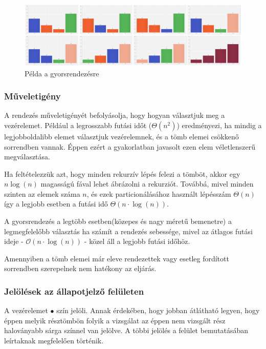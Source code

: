 \documentclass{elteikthesis}
\newcommand{\hiddensubsubsection}[1]{
	\stepcounter{subsubsection}
	\subsubsection*{{#1}}	
}
\begin{document}
 \begin{figure}[H]
 	\centering
 	\includegraphics[width=1\textwidth]{pics/quick.jpg}
 	\caption{Példa a gyorsrendezésre}
 \end{figure}
\hiddensubsubsection{Műveletigény}
A rendezés műveletigényét befolyásolja, hogy hogyan választjuk meg a vezérelemet. Például a legrosszabb futási időt ($\Theta(n^2)$) eredményezi, ha mindig a legjobboldalibb elemet választjuk vezérelemnek, és a tömb elemei csökkenő sorrendben vannak\cite{Cormen}. Éppen ezért a gyakorlatban javasolt ezen elem véletlenszerű megválasztása.\par
Ha feltételezzük azt, hogy minden rekurzív lépés felezi a tömböt, akkor egy $n\log(n)$ magasságú fával lehet ábrázolni a rekurziót. Továbbá, mivel minden szinten az elemek száma $n$, és ezek particionálásához használt lépésszám $\Theta(n)$ így a legjobb esetben a futási idő $\Theta(n\cdot\log(n))$.\par
 A gyorsrendezés a legtöbb esetben(közepes és nagy méretű bemenetre) a legmegfelelőbb választás ha számít a rendezés sebessége, mivel az átlagos futási ideje - $\mathcal{O}(n\cdot\log(n))$ - közel áll a legjobb futási időhöz\cite{Cormen}.\par
 Amennyiben a tömb elemei már eleve rendezettek vagy esetleg fordított sorrendben szerepelnek nem hatékony az eljárás.
\hiddensubsubsection{Jelölések az állapotjelző felületen}
A vezérelemet \textcolor{select}{\Huge$\bullet$} szín jelöli. Annak érdekében, hogy jobban átlátható legyen, hogy éppen melyik résztömbön folyik a vizsgálat az éppen nem vizsgált rész haloványabb sárga színnel van jelölve. A többi jelölés a felület bemutatásában leírtaknak megfelelően történik.
\end{document}
